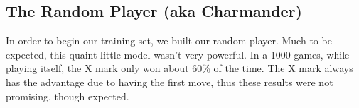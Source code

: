 
\subsection{The Random Player (aka Charmander)}
In order to begin our training set, we built our random player.
Much to be expected, this quaint little model wasn't very powerful.
In a 1000 games, while playing itself, the X mark only won about 60\% of the time.
The X mark always has the advantage due to having the first move, thus these results were not promising, though expected.
